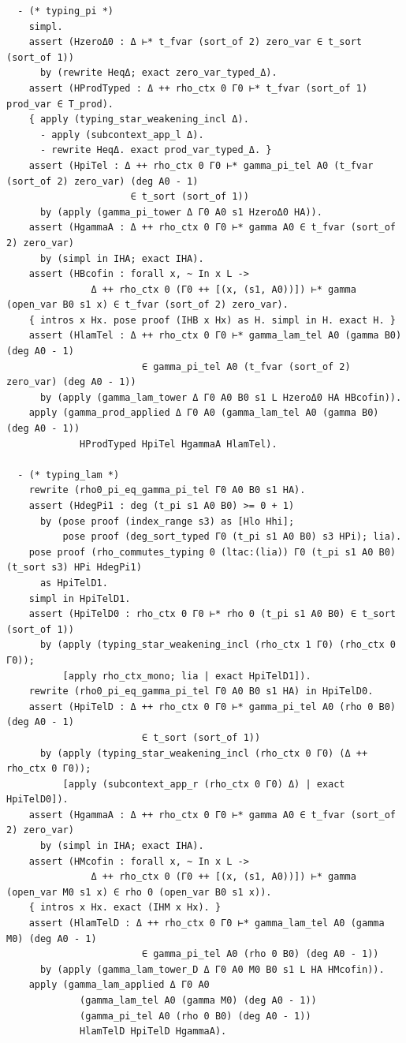 \begin{latin}
\begin{verbatim}
  - (* typing_pi *)
    simpl.
    assert (HzeroΔ0 : Δ ⊢* t_fvar (sort_of 2) zero_var ∈ t_sort (sort_of 1))
      by (rewrite HeqΔ; exact zero_var_typed_Δ).
    assert (HProdTyped : Δ ++ rho_ctx 0 Γ0 ⊢* t_fvar (sort_of 1) prod_var ∈ T_prod).
    { apply (typing_star_weakening_incl Δ).
      - apply (subcontext_app_l Δ).
      - rewrite HeqΔ. exact prod_var_typed_Δ. }
    assert (HpiTel : Δ ++ rho_ctx 0 Γ0 ⊢* gamma_pi_tel A0 (t_fvar (sort_of 2) zero_var) (deg A0 - 1)
                      ∈ t_sort (sort_of 1))
      by (apply (gamma_pi_tower Δ Γ0 A0 s1 HzeroΔ0 HA)).
    assert (HgammaA : Δ ++ rho_ctx 0 Γ0 ⊢* gamma A0 ∈ t_fvar (sort_of 2) zero_var)
      by (simpl in IHA; exact IHA).
    assert (HBcofin : forall x, ~ In x L ->
               Δ ++ rho_ctx 0 (Γ0 ++ [(x, (s1, A0))]) ⊢* gamma (open_var B0 s1 x) ∈ t_fvar (sort_of 2) zero_var).
    { intros x Hx. pose proof (IHB x Hx) as H. simpl in H. exact H. }
    assert (HlamTel : Δ ++ rho_ctx 0 Γ0 ⊢* gamma_lam_tel A0 (gamma B0) (deg A0 - 1)
                        ∈ gamma_pi_tel A0 (t_fvar (sort_of 2) zero_var) (deg A0 - 1))
      by (apply (gamma_lam_tower Δ Γ0 A0 B0 s1 L HzeroΔ0 HA HBcofin)).
    apply (gamma_prod_applied Δ Γ0 A0 (gamma_lam_tel A0 (gamma B0) (deg A0 - 1))
             HProdTyped HpiTel HgammaA HlamTel).

  - (* typing_lam *)
    rewrite (rho0_pi_eq_gamma_pi_tel Γ0 A0 B0 s1 HA).
    assert (HdegPi1 : deg (t_pi s1 A0 B0) >= 0 + 1)
      by (pose proof (index_range s3) as [Hlo Hhi];
          pose proof (deg_sort_typed Γ0 (t_pi s1 A0 B0) s3 HPi); lia).
    pose proof (rho_commutes_typing 0 (ltac:(lia)) Γ0 (t_pi s1 A0 B0) (t_sort s3) HPi HdegPi1)
      as HpiTelD1.
    simpl in HpiTelD1.
    assert (HpiTelD0 : rho_ctx 0 Γ0 ⊢* rho 0 (t_pi s1 A0 B0) ∈ t_sort (sort_of 1))
      by (apply (typing_star_weakening_incl (rho_ctx 1 Γ0) (rho_ctx 0 Γ0));
          [apply rho_ctx_mono; lia | exact HpiTelD1]).
    rewrite (rho0_pi_eq_gamma_pi_tel Γ0 A0 B0 s1 HA) in HpiTelD0.
    assert (HpiTelD : Δ ++ rho_ctx 0 Γ0 ⊢* gamma_pi_tel A0 (rho 0 B0) (deg A0 - 1)
                        ∈ t_sort (sort_of 1))
      by (apply (typing_star_weakening_incl (rho_ctx 0 Γ0) (Δ ++ rho_ctx 0 Γ0));
          [apply (subcontext_app_r (rho_ctx 0 Γ0) Δ) | exact HpiTelD0]).
    assert (HgammaA : Δ ++ rho_ctx 0 Γ0 ⊢* gamma A0 ∈ t_fvar (sort_of 2) zero_var)
      by (simpl in IHA; exact IHA).
    assert (HMcofin : forall x, ~ In x L ->
               Δ ++ rho_ctx 0 (Γ0 ++ [(x, (s1, A0))]) ⊢* gamma (open_var M0 s1 x) ∈ rho 0 (open_var B0 s1 x)).
    { intros x Hx. exact (IHM x Hx). }
    assert (HlamTelD : Δ ++ rho_ctx 0 Γ0 ⊢* gamma_lam_tel A0 (gamma M0) (deg A0 - 1)
                        ∈ gamma_pi_tel A0 (rho 0 B0) (deg A0 - 1))
      by (apply (gamma_lam_tower_D Δ Γ0 A0 M0 B0 s1 L HA HMcofin)).
    apply (gamma_lam_applied Δ Γ0 A0
             (gamma_lam_tel A0 (gamma M0) (deg A0 - 1))
             (gamma_pi_tel A0 (rho 0 B0) (deg A0 - 1))
             HlamTelD HpiTelD HgammaA).


\end{verbatim}
\end{latin}
